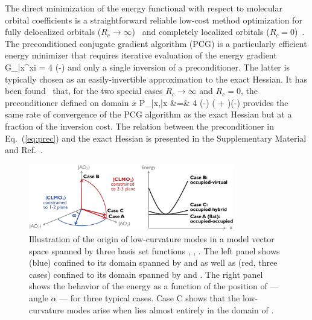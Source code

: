 \documentclass[aps,prl,twocolumn,reprint,amsmath,amssymb]{revtex4-1}
\begin{document}
The direct minimization of the energy functional with respect to molecular orbital coefficients is a straightforward reliable low-cost method optimization for fully delocalized orbitals ($R_c \rightarrow \infty$)~\cite{galli1992large,OT,GDM, Cayley-minimizer} and completely localized orbitals ($R_c = 0$)~\cite{khaliullin2013efficient}. The preconditioned conjugate gradient algorithm (PCG) is a particularly efficient energy minimizer that requires iterative evaluation of the energy gradient
%
\bea \label{eq:grad}
{G_{\bar{x}\mu}}^{xi} \equiv {} = 4  (-)  
\eea
%
and only a single inversion of a preconditioner. The latter is typically chosen as an easily-invertible approximation to the exact Hessian. It has been found~\cite{khaliullin2013efficient} that, for the two special cases $R_c \rightarrow \infty$ and $R_c = 0$, the preconditioner defined on domain $\bar{x}$
%
\bea \label{eq:prec}
P_{\bar{x}\mu,\bar{x}\nu} &=& 4  (-) ( + )(-)  
\eea
%
provides the same rate of convergence of the PCG algorithm as the exact Hessian but at a fraction of the inversion cost. The relation between the preconditioner in Eq.~(\ref{eq:prec}) and the exact Hessian is presented in the Supplementary Material and Ref.~.

\begin{figure}
\centering
\includegraphics[width=0.8\textwidth]{modes}
\caption{Illustration of the origin of low-curvature modes in a model vector space spanned by three basis set functions , , . The left panel shows  (blue) confined to its domain spanned by  and  as well as   (red, three cases) confined to its domain spanned by  and . The right panel shows the behavior of the energy as a function of the position of  --- angle $\alpha$ --- for three typical cases. Case C shows that the low-curvature modes arise when   lies almost entirely in the domain of .}
\label{fig:modes}
\end{figure}
\end{document}
